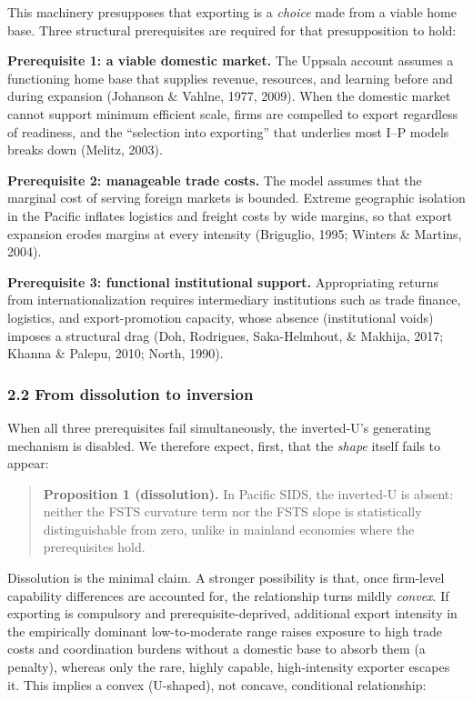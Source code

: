 \documentclass[
  12pt,a4paper]{article}
\begin{document}
This machinery presupposes that exporting is a \emph{choice} made from a
viable home base. Three structural prerequisites are required for that
presupposition to hold:

\textbf{Prerequisite 1: a viable domestic market.} The Uppsala
account assumes a functioning home base that supplies revenue,
resources, and learning before and during expansion (Johanson \& Vahlne,
1977, 2009). When the domestic market cannot support minimum efficient
scale, firms are compelled to export regardless of readiness, and the
``selection into exporting'' that underlies most I--P models breaks down
(Melitz, 2003).

\textbf{Prerequisite 2: manageable trade costs.} The model assumes
that the marginal cost of serving foreign markets is bounded. Extreme
geographic isolation in the Pacific inflates logistics and freight costs
by wide margins, so that export expansion erodes margins at every
intensity (Briguglio, 1995; Winters \& Martins, 2004).

\textbf{Prerequisite 3: functional institutional support.}
Appropriating returns from internationalization requires intermediary
institutions such as trade finance, logistics, and export-promotion capacity, whose absence (institutional voids) imposes a structural drag
(Doh, Rodrigues, Saka-Helmhout, \& Makhija, 2017; Khanna \& Palepu,
2010; North, 1990).

\hypertarget{from-dissolution-to-inversion}{%
\subsubsection{2.2 From dissolution to
inversion}\label{from-dissolution-to-inversion}}

When all three prerequisites fail simultaneously, the inverted-U's
generating mechanism is disabled. We therefore expect, first, that the
\emph{shape} itself fails to appear:

\begin{quote}
\textbf{Proposition 1 (dissolution).} In Pacific SIDS, the inverted-U is
absent: neither the FSTS curvature term nor the FSTS slope is
statistically distinguishable from zero, unlike in mainland economies
where the prerequisites hold.
\end{quote}

Dissolution is the minimal claim. A stronger possibility is that, once
firm-level capability differences are accounted for, the relationship
turns mildly \emph{convex}. If exporting is compulsory and
prerequisite-deprived, additional export intensity in the empirically
dominant low-to-moderate range raises exposure to high trade costs and
coordination burdens without a domestic base to absorb them (a penalty), whereas only the rare, highly capable, high-intensity exporter
escapes it. This implies a convex (U-shaped), not concave, conditional
relationship:
\end{document}
